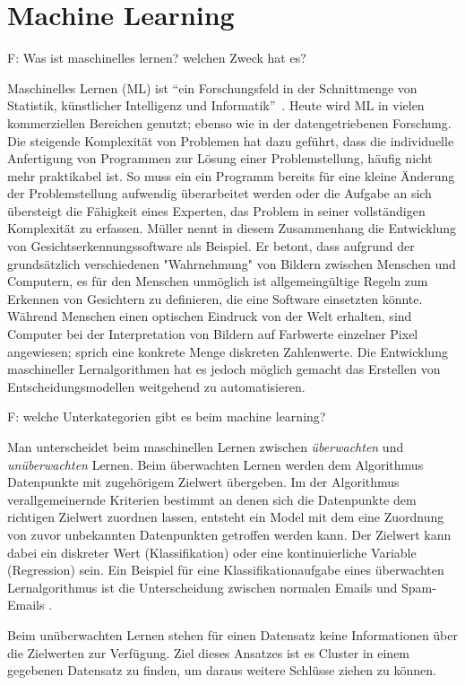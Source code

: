 \chapter{Machine Learning}
\label{ch:machine_learning}
F: Was ist maschinelles lernen? welchen Zweck hat es?

Maschinelles Lernen (ML) ist \enquote{ein Forschungsfeld in der Schnittmenge von Statistik, künstlicher Intelligenz und Informatik}~\cite[S.~1]{Muller.2017}. Heute wird ML in vielen kommerziellen Bereichen genutzt; ebenso wie in der datengetriebenen Forschung. Die steigende Komplexität von Problemen hat dazu geführt, dass die individuelle Anfertigung von Programmen zur Lösung einer Problemstellung, häufig nicht mehr praktikabel ist. So muss ein ein Programm bereits für eine kleine Änderung der Problemstellung aufwendig überarbeitet werden oder die Aufgabe an sich übersteigt die Fähigkeit eines Experten, das Problem in seiner vollständigen Komplexität zu erfassen. Müller \cite{Muller.2017} nennt in diesem Zusammenhang die Entwicklung von Gesichtserkennungssoftware als Beispiel. Er betont, dass aufgrund der grundsätzlich verschiedenen "Wahrnehmung" von Bildern zwischen Menschen und Computern, es für den Menschen unmöglich ist allgemeingültige Regeln zum Erkennen von Gesichtern zu definieren, die eine Software einsetzten könnte. Während Menschen einen optischen Eindruck von der Welt erhalten, sind Computer bei der Interpretation von Bildern auf Farbwerte einzelner Pixel angewiesen; sprich eine konkrete Menge diskreten Zahlenwerte. Die Entwicklung maschineller Lernalgorithmen hat es jedoch möglich gemacht das Erstellen von Entscheidungsmodellen weitgehend zu automatisieren.  

F: welche Unterkategorien gibt es beim machine learning?

Man unterscheidet beim maschinellen Lernen zwischen \textit{überwachten} und \textit{unüberwachten} Lernen. Beim überwachten Lernen werden dem Algorithmus Datenpunkte mit zugehörigem Zielwert übergeben. Im der Algorithmus verallgemeinernde Kriterien bestimmt an denen sich die Datenpunkte dem richtigen Zielwert zuordnen lassen, entsteht ein Model mit dem eine Zuordnung von zuvor unbekannten Datenpunkten getroffen werden kann. Der Zielwert kann dabei ein diskreter Wert (Klassifikation) oder eine kontinuierliche Variable (Regression) sein. Ein Beispiel für eine Klassifikationaufgabe eines überwachten Lernalgorithmus ist die Unterscheidung zwischen normalen Emails und Spam-Emails \cite[S.~2]{Muller.2017}.

Beim unüberwachten Lernen stehen für einen Datensatz keine Informationen über die Zielwerten zur Verfügung. Ziel dieses Ansatzes ist es Cluster in einem gegebenen Datensatz zu finden, um daraus weitere Schlüsse ziehen zu können.

